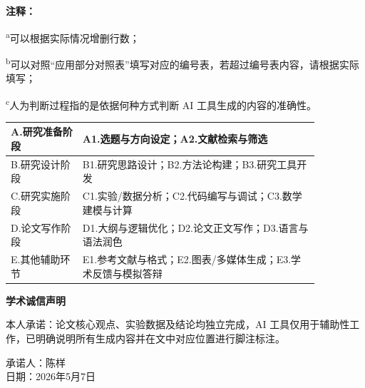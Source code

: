 \vspace{1.2em}
\noindent\textbf{注释：}

\vspace{0.4em}
\noindent
\textsuperscript{a}可以根据实际情况增删行数；

\vspace{0.4em}
\noindent
\textsuperscript{b}可以对照“应用部分对照表”填写对应的编号表，若超过编号表内容，请根据实际填写；

\vspace{0.4em}
\noindent
\textsuperscript{c}人为判断过程指的是依据何种方式判断 AI 工具生成的内容的准确性。

\vspace{2em}

\vspace{0.8em}
\begin{center}
    \centering
    \renewcommand{\arraystretch}{1.5}
    \setlength{\tabcolsep}{8pt}
    \begin{tabular}{|L{0.20\linewidth}|L{0.66\linewidth}|}
        \hline
        A.研究准备阶段 & A1.选题与方向设定；A2.文献检索与筛选 \\
        \hline
        B.研究设计阶段 & B1.研究思路设计；B2.方法论构建；B3.研究工具开发 \\
        \hline
        C.研究实施阶段 & C1.实验/数据分析；C2.代码编写与调试；C3.数学建模与计算 \\
        \hline
        D.论文写作阶段 & D1.大纲与逻辑优化；D2.论文正文写作；D3.语言与语法润色 \\
        \hline
        E.其他辅助环节 & E1.参考文献与格式；E2.图表/多媒体生成；E3.学术反馈与模拟答辩 \\
        \hline
    \end{tabular}
\end{center}

\vspace{2.5em}
\begin{center}
    {\bfseries 学术诚信声明}
\end{center}

\vspace{1em}
\noindent
本人承诺：论文核心观点、实验数据及结论均独立完成，AI 工具仅用于辅助性工作，已明确说明所有生成内容并在文中对应位置进行脚注标注。

\vspace{3em}
\begin{flushright}
    承诺人：陈样\\[1em]
    日期：2026年5月7日
\end{flushright}
